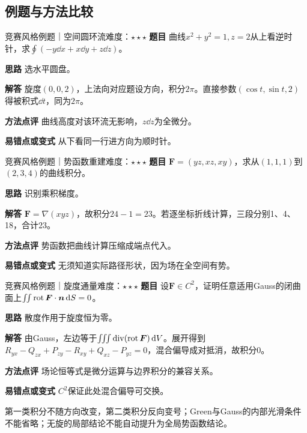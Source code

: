\subsection{例题与方法比较}
\begin{example}{竞赛风格例题｜空间圆环流}{难度：$\star\star\star$}
\label{ex:8:13}\textbf{题目} 曲线$x^2+y^2=1,z=2$从上看逆时针，求$\oint(-y\dd x+x\dd y+z\dd z)$。\par
\textbf{思路} 选水平圆盘。\par
\textbf{解答} 旋度$(0,0,2)$，上法向对应题设方向，积分$2\pi$。直接参数$(\cos t,\sin t,2)$得被积式$\dd t$，同为$2\pi$。\par
\textbf{方法点评} 曲线高度对该环流无影响，$z\dd z$为全微分。\par
\textbf{易错点或变式} 从下看同一行进方向为顺时针。
\end{example}
\begin{example}{竞赛风格例题｜势函数重建}{难度：$\star\star\star$}
\label{ex:8:14}\textbf{题目} $\bm F=(yz,xz,xy)$，求从$(1,1,1)$到$(2,3,4)$的曲线积分。\par
\textbf{思路} 识别乘积梯度。\par
\textbf{解答} $\bm F=\nabla(xyz)$，故积分$24-1=23$。若逐坐标折线计算，三段分别1、4、18，合计23。\par
\textbf{方法点评} 势函数把曲线计算压缩成端点代入。\par
\textbf{易错点或变式} 无须知道实际路径形状，因为场在全空间有势。
\end{example}
\begin{example}{竞赛风格例题｜旋度通量}{难度：$\star\star\star$}
\label{ex:8:15}\textbf{题目} 设$\bm F\in C^2$，证明任意适用Gauss的闭曲面上$\iint\operatorname{rot}\bm F\cdot\bm n\mathop{}\!\mathrm{d} S=0$。\par
\textbf{思路} 散度作用于旋度恒为零。\par
\textbf{解答} 由Gauss，左边等于$\iiint\operatorname{div}(\operatorname{rot}\bm F)\mathop{}\!\mathrm{d} V$。展开得到$R_{yx}-Q_{zx}+P_{zy}-R_{xy}+Q_{xz}-P_{yz}=0$，混合偏导成对抵消，故积分0。\par
\textbf{方法点评} 场论恒等式是微分运算与边界积分的兼容关系。\par
\textbf{易错点或变式} $C^2$保证此处混合偏导可交换。
\end{example}
\begin{warning}第一类积分不随方向改变，第二类积分反向变号；Green与Gauss的内部光滑条件不能省略；无旋的局部结论不能自动提升为全局势函数结论。\end{warning}






